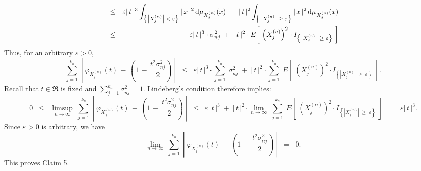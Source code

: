 {\begin{eqnarray*}
\\
&\leq&
\varepsilon \vert\,t\,\vert^{3} \int_{\left\{\left\vert X^{(n)}_{j} \right\vert\;<\;\varepsilon\right\}} \vert\,x\,\vert^{2} \,\textnormal{d}\mu_{X^{(n)}_{j}}(x)
\;+\;
\vert\,t\,\vert^{2} \int_{\left\{\left\vert X^{(n)}_{j} \right\vert\;\geq\;\varepsilon\right\}} \vert\,x\,\vert^{2} \,\textnormal{d}\mu_{X^{(n)}_{j}}(x)
\\
&\leq&
\varepsilon \vert\,t\,\vert^{3}\cdot\sigma^{2}_{nj}
\;+\;
\vert\,t\,\vert^{2}\cdot E\!\left[\;\left(X^{(n)}_{j}\right)^{2} \cdot I_{\left\{\left\vert X^{(n)}_{j} \right\vert\;\geq\;\varepsilon\right\}} \;\right]
\end{eqnarray*}
Thus, for an arbitrary $\varepsilon > 0$,
\begin{equation*}
\sum_{j=1}^{k_{n}}\;
\left\vert\;
\varphi_{X^{(n)}_{j}}(t) \, - \, \left(1 \, - \, \dfrac{t^{2}\sigma^{2}_{nj}}{2}\right)
\;\right\vert
\;\;\leq\;\;
\varepsilon \vert\,t\,\vert^{3}\cdot \sum_{j=1}^{k_{n}}\;\sigma^{2}_{nj}
\;+\;
\vert\,t\,\vert^{2}\cdot
\sum_{j=1}^{k_{n}}\;E\!\left[\;\left(X^{(n)}_{j}\right)^{2} \cdot I_{\left\{\left\vert X^{(n)}_{j} \right\vert\;\geq\;\varepsilon\right\}} \;\right].
\end{equation*}
Recall that $t \in \Re$ is fixed and $\sum_{j=1}^{k_{n}}\sigma^{2}_{nj} = 1$.
Lindeberg's condition therefore implies:
\begin{equation*}
0\;\;\leq\;\;
\limsup_{n\rightarrow\infty}\;
\sum_{j=1}^{k_{n}}\;
\left\vert\;
\varphi_{X^{(n)}_{j}}(t) \, - \, \left(1 \, - \, \dfrac{t^{2}\sigma^{2}_{nj}}{2}\right)
\;\right\vert
\;\;\leq\;\;
\varepsilon \vert\,t\,\vert^{3}
\;+\;
\vert\,t\,\vert^{2}\cdot
\lim_{n\rightarrow\infty}\;
\sum_{j=1}^{k_{n}}\;E\!\left[\;\left(X^{(n)}_{j}\right)^{2} \cdot I_{\left\{\left\vert X^{(n)}_{j} \right\vert\;\geq\;\varepsilon\right\}} \;\right]
\;\;=\;\;
\varepsilon \vert\,t\,\vert^{3}.
\end{equation*}
Since $\varepsilon > 0$ is arbitrary, we have
\begin{equation*}
\lim_{n\rightarrow\infty}\;
\sum_{j=1}^{k_{n}}\;
\left\vert\;
\varphi_{X^{(n)}_{j}}(t) \, - \, \left(1 \, - \, \dfrac{t^{2}\sigma^{2}_{nj}}{2}\right)
\;\right\vert
\;\;=\;\; 0.
\end{equation*}
This proves Claim 5.
}

